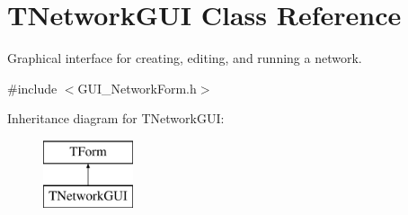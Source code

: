 \hypertarget{class_t_network_g_u_i}{\section{T\+Network\+G\+U\+I Class Reference}
\label{class_t_network_g_u_i}
}


Graphical interface for creating, editing, and running a network.  




{\ttfamily \#include $<$G\+U\+I\+\_\+\+Network\+Form.\+h$>$}

Inheritance diagram for T\+Network\+G\+U\+I\+:\begin{figure}[H]
\begin{center}
\leavevmode
\includegraphics[height=2.000000cm]{class_t_network_g_u_i}
\end{center}
\end{figure}

